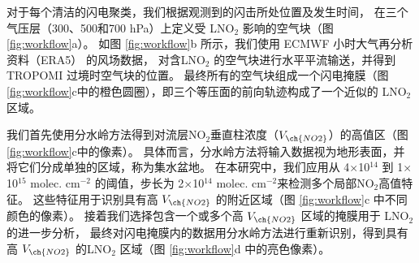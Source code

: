 对于每个清洁的闪电聚类，我们根据观测到的闪击所处位置及发生时间，
在三个气压层（300、500和700 hPa）上定义受 LNO$_2$ 影响的空气块（图 \ref{fig:workflow}a）。
如图 \ref{fig:workflow}b 所示，我们使用 ECMWF 小时大气再分析资料（ERA5） 的风场数据\citep{Hersbach.2020}，
对含LNO$_2$ 的空气块进行水平平流输送，并得到TROPOMI 过境时空气块的位置。
最终所有的空气块组成一个闪电掩膜（图 \ref{fig:workflow}c中的橙色圆圈），即三个等压面的前向轨迹构成了一个近似的 LNO$_2$ 区域。

我们首先使用分水岭方法得到对流层NO$_2$垂直柱浓度（$V_{\ch{NO2}}$）的高值区（图 \ref{fig:workflow}c中的像素）。
具体而言，分水岭方法将输入数据视为地形表面，并将它们分成单独的区域，称为集水盆地\citep{Soille.1990,Heikenfeld.2019a}。
在本研究中，我们应用从 4$\times$10$^{14}$ 到 1$\times$10$^{15}$ molec. cm$^{-2}$ 的阈值，步长为 2$\times$10$^{14}$ molec. cm$^{-2}$来检测多个局部NO$_2$高值特征。
这些特征用于识别具有高 $V_{\ch{NO2}}$ 的附近区域（图 \ref{fig:workflow}c 中不同颜色的像素）。
接着我们选择包含一个或多个高 $V_{\ch{NO2}}$ 区域的掩膜用于 LNO$_2$ 的进一步分析，
最终对闪电掩膜内的数据用分水岭方法进行重新识别，得到具有高 $V_{\ch{NO2}}$ 的LNO$_2$ 区域（图 \ref{fig:workflow}d 中的亮色像素）。


